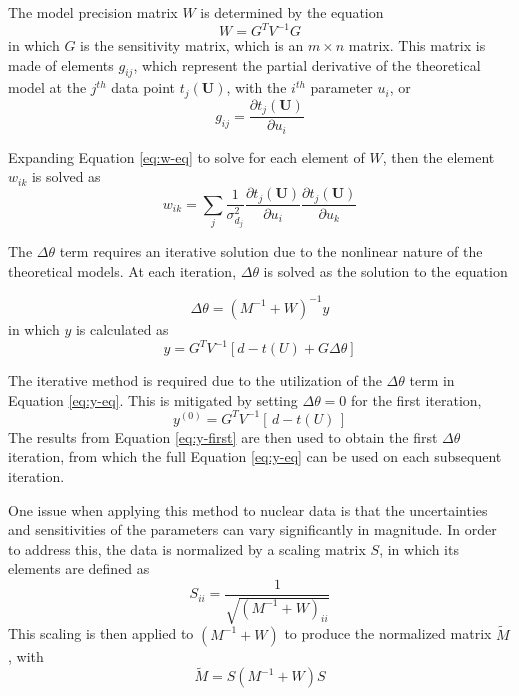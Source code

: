 The model precision matrix $W$ is determined by the equation
\begin{equation}
    W = G^T V^{-1} G
    \label{eq:w-eq}
\end{equation}
in which $G$ is the sensitivity matrix, which is an $m \times n$ matrix. This matrix is made of elements $g_{ij}$, which represent the partial derivative of the theoretical model at the $j^{th}$ data point $t_j(\mathbf{U})$,  with the $i^{th}$ parameter $u_i$, or
\begin{equation}
    g_{ij} = \frac{\partial t_j(\mathbf{U})}{\partial u_i}
\end{equation}

Expanding Equation \ref{eq:w-eq} to solve for each element of $W$, then the element $w_{ik}$ is solved as
\begin{equation}
    w_{ik} = \sum_{j} \frac{1}{\sigma_{d_j}^2}\frac{\partial t_j(\mathbf{U})}{\partial u_i}\frac{\partial t_j(\mathbf{U})}{\partial u_k}
\end{equation}

The $\Delta \theta$ term requires an iterative solution due to the nonlinear nature of the theoretical models. At each iteration, $\Delta \theta$ is solved as the solution to the equation

\begin{equation}
    \Delta \theta = (M^{-1} + W)^{-1} y
\end{equation}
in which $y$ is calculated as
\begin{equation}
    y = G^{T}V^{-1} \left[ d - t(U) + G\Delta\theta \right]
    \label{eq:y-eq}
\end{equation}

The iterative method is required due to the utilization of the $\Delta \theta$ term in Equation \ref{eq:y-eq}. This is mitigated by setting $\Delta \theta = 0$ for the first iteration, 
\begin{equation}
    y^{(0)} = G^T V^{-1}[\, d - t(U) \,]
    \label{eq:y-first}
\end{equation}
The results from Equation \ref{eq:y-first} are then used to obtain the first $\Delta \theta$ iteration, from which the full Equation \ref{eq:y-eq} can be used on each subsequent iteration.

One issue when applying this method to nuclear data is that the uncertainties and sensitivities of the parameters can vary significantly in magnitude. In order to address this, the data is normalized by a scaling matrix $S$, in which its elements are defined as
\begin{equation}
    S_{ii} = \frac{1}{\sqrt{(M^{-1} + W)_{ii}}}
\end{equation}
This scaling is then applied to $(M^{-1} + W)$ to produce the normalized matrix $\widetilde{M}$, with
\begin{equation}
    \widetilde{M} = S (M^{-1} + W) S
\end{equation}


